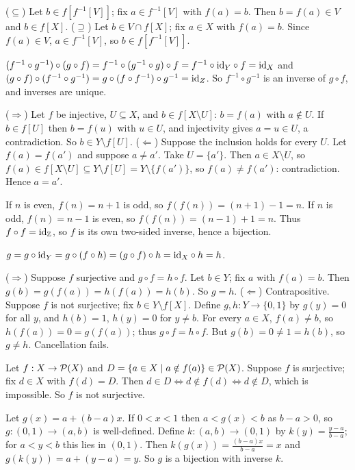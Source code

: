  ($\subseteq$) Let $b\in f[f^{-1}[V]]$; fix $a\in f^{-1}[V]$ with $f(a)=b$. Then $b=f(a)\in V$ and $b\in f[X]$. ($\supseteq$) Let $b\in V\cap f[X]$; fix $a\in X$ with $f(a)=b$. Since $f(a)\in V$, $a\in f^{-1}[V]$, so $b\in f[f^{-1}[V]]$.

 $(f^{-1}\circ g^{-1})\circ(g\circ f)=f^{-1}\circ(g^{-1}\circ g)\circ f=f^{-1}\circ\mathrm{id}_Y\circ f=\mathrm{id}_X$ and $(g\circ f)\circ(f^{-1}\circ g^{-1})=g\circ(f\circ f^{-1})\circ g^{-1}=\mathrm{id}_Z$. So $f^{-1}\circ g^{-1}$ is an inverse of $g\circ f$, and inverses are unique.

 ($\Rightarrow$) Let $f$ be injective, $U\subseteq X$, and $b\in f[X\setminus U]$: $b=f(a)$ with $a\notin U$. If $b\in f[U]$ then $b=f(u)$ with $u\in U$, and injectivity gives $a=u\in U$, a contradiction. So $b\in Y\setminus f[U]$. ($\Leftarrow$) Suppose the inclusion holds for every $U$. Let $f(a)=f(a')$ and suppose $a\ne a'$. Take $U=\{a'\}$. Then $a\in X\setminus U$, so $f(a)\in f[X\setminus U]\subseteq Y\setminus f[U]=Y\setminus\{f(a')\}$, so $f(a)\ne f(a')$: contradiction. Hence $a=a'$.

 If $n$ is even, $f(n)=n+1$ is odd, so $f(f(n))=(n+1)-1=n$. If $n$ is odd, $f(n)=n-1$ is even, so $f(f(n))=(n-1)+1=n$. Thus $f\circ f=\mathrm{id}_{\mathbb{Z}}$, so $f$ is its own two-sided inverse, hence a bijection.

 $g=g\circ\mathrm{id}_Y=g\circ(f\circ h)=(g\circ f)\circ h=\mathrm{id}_X\circ h=h$.

 ($\Rightarrow$) Suppose $f$ surjective and $g\circ f=h\circ f$. Let $b\in Y$; fix $a$ with $f(a)=b$. Then $g(b)=g(f(a))=h(f(a))=h(b)$. So $g=h$. ($\Leftarrow$) Contrapositive. Suppose $f$ is not surjective; fix $b\in Y\setminus f[X]$. Define $g,h:Y\to\{0,1\}$ by $g(y)=0$ for all $y$, and $h(b)=1$, $h(y)=0$ for $y\ne b$. For every $a\in X$, $f(a)\ne b$, so $h(f(a))=0=g(f(a))$; thus $g\circ f=h\circ f$. But $g(b)=0\ne1=h(b)$, so $g\ne h$. Cancellation fails.

 Let $f:X\to\mathcal{P}(X)$ and $D=\{a\in X\mid a\notin f(a)\}\in\mathcal{P}(X)$. Suppose $f$ is surjective; fix $d\in X$ with $f(d)=D$. Then $d\in D\Leftrightarrow d\notin f(d)\Leftrightarrow d\notin D$, which is impossible. So $f$ is not surjective.

 Let $g(x)=a+(b-a)x$. If $0<x<1$ then $a<g(x)<b$ as $b-a>0$, so $g:(0,1)\to(a,b)$ is well-defined. Define $k:(a,b)\to(0,1)$ by $k(y)=\frac{y-a}{b-a}$; for $a<y<b$ this lies in $(0,1)$. Then $k(g(x))=\frac{(b-a)x}{b-a}=x$ and $g(k(y))=a+(y-a)=y$. So $g$ is a bijection with inverse $k$.

